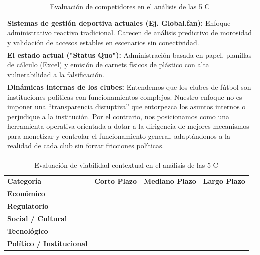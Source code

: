 \newpage

\begin{table}[h!]
\centering
\renewcommand{\arraystretch}{1.5}
\begin{tabularx}{\textwidth}{|X|}
\hline
\rowcolor{orange!20} \multicolumn{1}{|c|}{\textbf{COMPETIDORES}} \\ \hline
\textbf{Sistemas de gestión deportiva actuales (Ej. Global.fan):} Enfoque administrativo reactivo tradicional. Carecen de análisis predictivo de morosidad y validación de accesos estables en escenarios sin conectividad. \\
\textbf{El estado actual ("Status Quo"):} Administración basada en papel, planillas de cálculo (Excel) y emisión de carnets físicos de plástico con alta vulnerabilidad a la falsificación. \\
\textbf{Dinámicas internas de los clubes:} Entendemos que los clubes de fútbol son instituciones políticas con funcionamientos complejos. Nuestro enfoque no es imponer una “transparencia disruptiva” que entorpezca los asuntos internos o perjudique a la institución. Por el contrario, nos posicionamos como una herramienta operativa orientada a dotar a la dirigencia de mejores mecanismos para monetizar y controlar el funcionamiento general, adaptándonos a la realidad de cada club sin forzar fricciones políticas. \\ \hline
\end{tabularx}
\caption{Evaluación de competidores en el análisis de las 5 C}
\label{tab:tabla_competidores}
\end{table}

\vspace{0.3cm}

\begin{table}[h!]
\centering
\renewcommand{\arraystretch}{1.5}
\begin{tabularx}{\textwidth}{|l|X|X|X|}
\hline
\rowcolor{red!20} \multicolumn{4}{|c|}{\textbf{CONTEXTO}} \\ \hline
\rowcolor{red!10} \textbf{Categoría} & \textbf{Corto Plazo} & \textbf{Mediano Plazo} & \textbf{Largo Plazo} \\ \hline
\textbf{Económico} & \cellcolor{orange!50} & \cellcolor{green!50} & \cellcolor{green!50} \\ \hline
\textbf{Regulatorio} & \cellcolor{green!50} & \cellcolor{green!50} & \cellcolor{green!50} \\ \hline
\textbf{Social / Cultural} & \cellcolor{orange!50} & \cellcolor{green!50} & \cellcolor{green!50} \\ \hline
\textbf{Tecnológico} & \cellcolor{green!50} & \cellcolor{green!50} & \cellcolor{green!50} \\ \hline
\textbf{Político / Institucional} & \cellcolor{orange!50} & \cellcolor{orange!50} & \cellcolor{green!50} \\ \hline
\end{tabularx}
\caption{Evaluación de viabilidad contextual en el análisis de las 5 C}
\label{tab:tabla_contexto}
\end{table}

